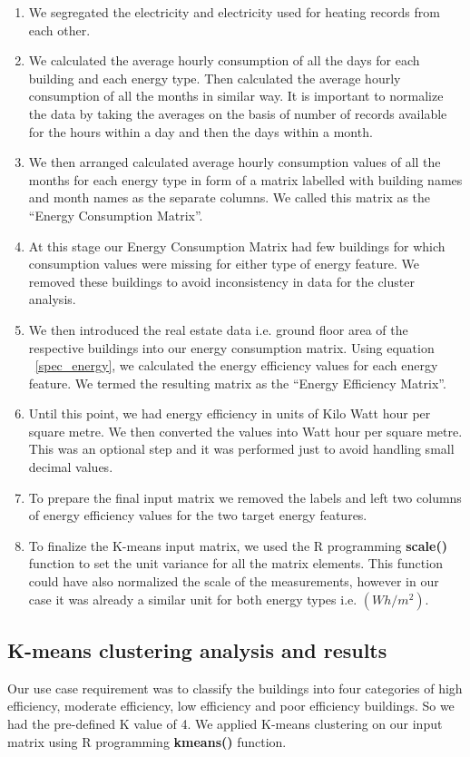 \begin{enumerate}
\item We segregated the electricity and electricity used for heating records from each other.
\item We calculated the average hourly consumption of all the days for each building and each energy type. Then calculated the average hourly consumption of all the months in similar way. It is important to normalize the data by taking the averages on the basis of number of records available for the hours within a day and then the days within a month. 
\item We then arranged calculated average hourly consumption values of all the months for each energy type in form of a matrix labelled with building names and month names as the separate columns. We called this matrix as the ``Energy Consumption Matrix''.   
\item At this stage our Energy Consumption Matrix had few buildings for which consumption values were missing for either type of energy feature. We removed these buildings to avoid inconsistency in data for the cluster analysis. 
\item We then introduced the real estate data i.e. ground floor area of the respective buildings into our energy consumption matrix. Using equation ~\ref{spec_energy}, we calculated the energy efficiency values for each energy feature. We termed the resulting matrix as the ``Energy Efficiency Matrix''.
\item Until this point, we had energy efficiency in units of Kilo Watt hour per square metre. We then converted the values into Watt hour per square metre. This was an optional step and it was performed just to avoid handling small decimal values.
\item To prepare the final input matrix we removed the labels and left two columns of energy efficiency values for the two target energy features.
\item To finalize the K-means input matrix, we used the R programming \textbf{scale()} function to set the unit variance for all the matrix elements. This function could have also normalized the scale of the measurements, however in our case it was already a similar unit for both energy types i.e. \((Wh/m^2)\).        
\end{enumerate}
\subsection{K-means clustering analysis and results}
Our use case requirement was to classify the buildings into four categories of high efficiency, moderate efficiency, low efficiency and poor efficiency buildings. So we had the pre-defined K value of 4. We applied K-means clustering on our input matrix using R programming \textbf{kmeans()} function.

